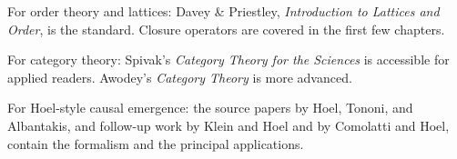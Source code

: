 For order theory and lattices: Davey \& Priestley,
\textit{Introduction to Lattices and Order}, is the standard.
Closure operators are covered in the first few chapters.

For category theory: Spivak's \textit{Category Theory for the
Sciences} is accessible for applied readers. Awodey's
\textit{Category Theory} is more advanced.

For Hoel-style causal emergence: the source papers by Hoel,
Tononi, and Albantakis, and follow-up work by Klein and Hoel and
by Comolatti and Hoel, contain the formalism and the principal
applications.
